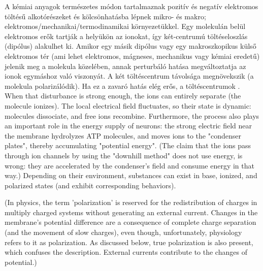\else
A kémiai anyagok természetes módon tartalmaznak
pozitív és negatív elektromos töltésű alkotórészeket
és kölcsönhatásba lépnek mikro- és makro; elektromos/mechanikai/termodinamikai környezetükkel.
Egy molekulán belül elektromos erők tartják a helyükön az ionokat, így két-centrumú töltéseloszlás (dipólus)
alakulhet ki.
Amikor egy másik dipólus vagy egy makroszkopikus külső 
elektromos tér (ami lehet elektromos, mágneses, mechanikus vagy kémiai eredetű) jelenik meg a molekula
közelében, annak perturbáló hatása megváltoztatja
az ionok egymáshoz való viszonyát.
A két töltéscentrum távolsága megnövekszik (a molekula polarizálódik). Ha ez a zavaró hatás elég erős, 
a töltéscentrumok 
. When that disturbance is strong enough, the ions can entirely separate (the molecule ionizes). The local electrical field fluctuates, so their state is dynamic: molecules dissociate, and free ions recombine. Furthermore, the process also plays an important role in the energy supply of neurons: the strong electric field near the membrane hydrolyzes \gls{ATP} molecules, and moves ions to the
"condenser plates", thereby accumulating "potential energy". (The claim that the ions pass through ion channels by using the "downhill method"
does not use energy, is wrong: they are accelerated by the condenser's field and consume energy in that way.) Depending on their environment, substances can exist in base, ionized, and polarized states (and exhibit corresponding behaviors).

\fi

\ifx\magyar\undefined
(In physics,
the term 'polarization' is reserved for the redistribution of charges in multiply charged systems without generating an external current. Changes in the membrane's potential difference are a consequence of complete charge separation (and the movement of slow charges), even though, unfortunately, physiology refers to it as polarization. As discussed below, true polarization is also present, which confuses the description. External currents contribute to the changes of potential.) 

